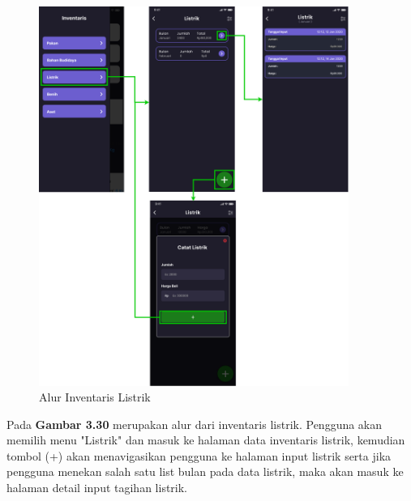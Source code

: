 \begin{enumerate}
\begin{enumerate}
		\begin{figure}[H]
			\centering
			\includegraphics[width=0.9\textwidth]{gambar/sprint2/flow_electric.png}
			\caption{Alur Inventaris Listrik}
		\end{figure}

		Pada \textbf{Gambar 3.30} merupakan alur dari inventaris listrik. Pengguna akan memilih menu "Listrik" dan masuk ke halaman data inventaris listrik, kemudian tombol (+) akan menavigasikan pengguna ke halaman input listrik serta jika pengguna menekan salah satu list bulan pada data listrik, maka akan masuk ke halaman detail input tagihan listrik.


\end{enumerate}
\end{enumerate}
